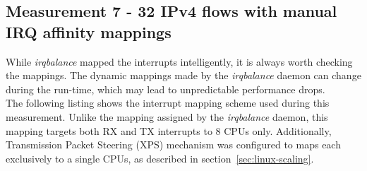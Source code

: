 
\subsection{Measurement 7 - 32 IPv4 flows with manual IRQ affinity mappings}
While {\it{irqbalance}} mapped the interrupts intelligently, it is always worth checking the mappings.
The dynamic mappings made by the {\it{irqbalance}} daemon can change during the run-time, which may lead
to unpredictable performance drops.
\\
The following listing shows the interrupt mapping scheme used during this measurement.
Unlike the mapping assigned by the {\it{irqbalance}} daemon,
this mapping targets both RX and TX interrupts to 8 CPUs only.
Additionally, Transmission Packet Steering (XPS) mechanism was configured
to maps each exclusively to a single CPUs, as described in section~\ref{sec:linux-scaling}.
